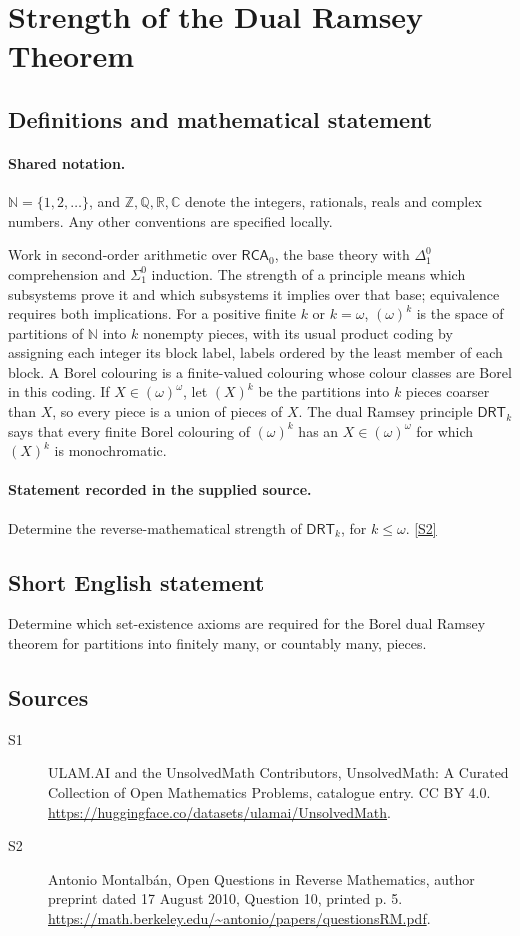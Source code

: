 \documentclass[11pt]{article}
\newcommand{\sref}[2]{\hyperlink{source:#1:#2}{[S#2]}}
\begin{document}
\section{Strength of the Dual Ramsey Theorem}\label{statement}

\subsection{Definitions and mathematical statement}

\paragraph{Shared notation.}$\mathbb N=\{1,2,\ldots\}$, and $\mathbb Z,\mathbb Q,\mathbb R,\mathbb C$ denote the integers, rationals, reals and complex numbers. Any other conventions are specified locally.


Work in second-order arithmetic over $\mathsf{RCA}_0$, the base theory with $\Delta^0_1$ comprehension and $\Sigma^0_1$ induction. The strength of a principle means which subsystems prove it and which subsystems it implies over that base; equivalence requires both implications. For a positive finite $k$ or $k=\omega$, $(\omega)^k$ is the space of partitions of $\mathbb N$ into $k$ nonempty pieces, with its usual product coding by assigning each integer its block label, labels ordered by the least member of each block. A Borel colouring is a finite-valued colouring whose colour classes are Borel in this coding. If $X\in(\omega)^\omega$, let $(X)^k$ be the partitions into $k$ pieces coarser than $X$, so every piece is a union of pieces of $X$. The dual Ramsey principle $\mathsf{DRT}_k$ says that every finite Borel colouring of $(\omega)^k$ has an $X\in(\omega)^\omega$ for which $(X)^k$ is monochromatic.
\paragraph{Statement recorded in the supplied source.}
Determine the reverse-mathematical strength of $\mathsf{DRT}_k$, for $k\leq\omega$. \sref{statement}{2}
\subsection{Short English statement}
Determine which set-existence axioms are required for the Borel dual Ramsey theorem for partitions into finitely many, or countably many, pieces.
\subsection{Sources}
\begin{description}
\item[\hypertarget{source:statement:1}{S1}] ULAM.AI and the UnsolvedMath Contributors, UnsolvedMath: A Curated Collection of Open Mathematics Problems, catalogue entry. CC BY 4.0. \url{https://huggingface.co/datasets/ulamai/UnsolvedMath}.
\item[\hypertarget{source:statement:2}{S2}] Antonio Montalbán, Open Questions in Reverse Mathematics, author preprint dated 17 August 2010, Question 10, printed p. 5. \url{https://math.berkeley.edu/~antonio/papers/questionsRM.pdf}.
\end{description}
\label{end:statement}
\end{document}
